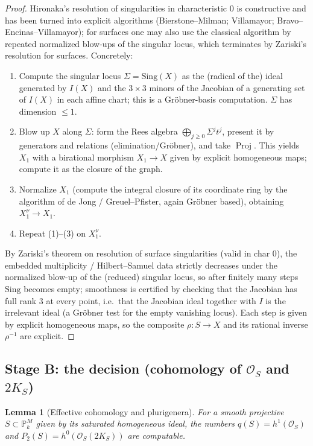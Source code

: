 \documentclass{amsart}
\theoremstyle{plain}
\newtheorem{lemma}{Lemma}
\theoremstyle{definition}
\newcommand{\PP}{\mathbb{P}}
\newcommand{\cO}{\mathcal{O}}
\DeclareMathOperator{\Proj}{Proj}
\begin{document}
\begin{proof}
Hironaka's resolution of singularities in characteristic $0$ is constructive and
has been turned into explicit algorithms (Bierstone--Milman; Villamayor;
Bravo--Encinas--Villamayor); for surfaces one may also use the classical
algorithm by repeated normalized blow-ups of the singular locus, which
terminates by Zariski's resolution for surfaces.  Concretely:
\begin{enumerate}
\item Compute the singular locus $\Sigma=\mathrm{Sing}(X)$ as the (radical of
the) ideal generated by $I(X)$ and the $3\times3$ minors of the Jacobian of a
generating set of $I(X)$ in each affine chart; this is a Gr\"obner-basis
computation.  $\Sigma$ has dimension $\le1$.
\item Blow up $X$ along $\Sigma$: form the Rees algebra
$\bigoplus_{j\ge0}\Sigma^j t^j$, present it by generators and relations
(elimination/Gr\"obner), and take $\Proj$.  This yields $X_1$ with a birational
morphism $X_1\to X$ given by explicit homogeneous maps; compute it as the closure
of the graph.
\item Normalize $X_1$ (compute the integral closure of its coordinate ring by
the algorithm of de Jong / Greuel--Pfister, again Gr\"obner based), obtaining
$X_1^{\nu}\to X_1$.
\item Repeat (1)--(3) on $X_1^{\nu}$.
\end{enumerate}
By Zariski's theorem on resolution of surface singularities (valid in char $0$),
the embedded multiplicity / Hilbert--Samuel data strictly decreases under the
normalized blow-up of the (reduced) singular locus, so after finitely many
steps $\mathrm{Sing}$ becomes empty; smoothness is certified by checking that the
Jacobian has full rank $3$ at every point, i.e.\ that the Jacobian ideal together
with $I$ is the irrelevant ideal (a Gr\"obner test for the empty vanishing
locus).  Each step is given by explicit homogeneous maps, so the composite
$\rho\colon S\to X$ and its rational inverse $\rho^{-1}$ are explicit.
\end{proof}

\subsection{Stage B: the decision (cohomology of $\cO_S$ and $2K_S$)}

\begin{lemma}[Effective cohomology and plurigenera]\label{lem:cohomology}
For a smooth projective $S\subset\PP^M_k$ given by its saturated homogeneous
ideal, the numbers $q(S)=h^1(\cO_S)$ and $P_2(S)=h^0(\cO_S(2K_S))$ are
computable.
\end{lemma}
\end{document}
